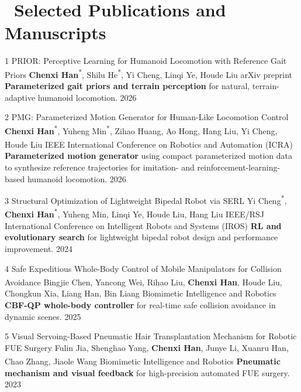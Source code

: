 \documentclass{resume}
\begin{document}

\section{\faBook\ Selected Publications and Manuscripts}
\publication
{1}
{PRIOR: Perceptive Learning for Humanoid Locomotion with Reference Gait Priors}
{\textbf{Chenxi Han}\textsuperscript{*}, Shilu He\textsuperscript{*}, Yi Cheng, Linqi Ye, Houde Liu\textsuperscript{\dag}}
{arXiv preprint}
{\textbf{Parameterized gait priors and terrain perception} for natural, terrain-adaptive humanoid locomotion.}
{2026}

\publication
{2}
{PMG: Parameterized Motion Generator for Human-Like Locomotion Control}
{\textbf{Chenxi Han}\textsuperscript{*}, Yuheng Min\textsuperscript{*}, Zihao Huang, Ao Hong, Hang Liu, Yi Cheng, Houde Liu\textsuperscript{\dag}}
{IEEE International Conference on Robotics and Automation (ICRA)}
{\textbf{Parameterized motion generator} using compact parameterized motion data to synthesize reference trajectories for imitation- and reinforcement-learning-based humanoid locomotion.}
{2026}

\publication
{3}
{Structural Optimization of Lightweight Bipedal Robot via SERL}
{Yi Cheng\textsuperscript{*}, \textbf{Chenxi Han}\textsuperscript{*}, Yuheng Min, Linqi Ye, Houde Liu\textsuperscript{\dag}, Hang Liu}
{IEEE/RSJ International Conference on Intelligent Robots and Systems (IROS)}
{\textbf{RL and evolutionary search} for lightweight bipedal robot design and performance improvement.}
{2024}

\publication
{4}
{Safe Expeditious Whole-Body Control of Mobile Manipulators for Collision Avoidance}
{Bingjie Chen, Yancong Wei, Rihao Liu, \textbf{Chenxi Han}, Houde Liu\textsuperscript{\dag}, Chongkun Xia, Liang Han, Bin Liang}
{Biomimetic Intelligence and Robotics}
{\textbf{CBF-QP whole-body controller} for real-time safe collision avoidance in dynamic scenes.}
{2025}

\publication
{5}
{Visual Servoing-Based Pneumatic Hair Transplantation Mechanism for Robotic FUE Surgery}
{Fulin Jia, Shenghao Yang, \textbf{Chenxi Han}, Junye Li, Xuanru Han, Chao Zhang, Jiaole Wang\textsuperscript{\dag}}
{Biomimetic Intelligence and Robotics}
{\textbf{Pneumatic mechanism and visual feedback} for high-precision automated FUE surgery.}
{2023}
\end{document}
